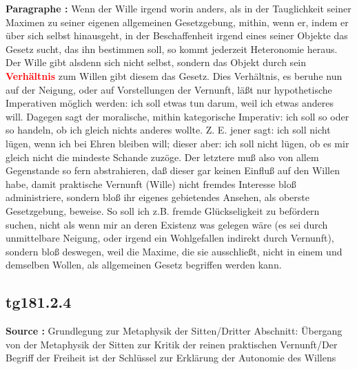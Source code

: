 \documentclass[a4paper,12pt,twoside]{book}
\newcommand{\match}[1]{\textcolor{red}{\textbf{#1}}}
\begin{document}
	\noindent\textbf{Paragraphe : }Wenn der Wille irgend worin anders, als in der Tauglichkeit seiner Maximen zu seiner eigenen allgemeinen Gesetzgebung, mithin, wenn er, indem er über sich selbst hinausgeht, in der Beschaffenheit irgend eines seiner Objekte das Gesetz sucht, das ihn bestimmen soll, so kommt jederzeit Heteronomie heraus. Der Wille gibt alsdenn sich nicht selbst, sondern das Objekt durch sein \match{Verhältnis} zum Willen gibt diesem das Gesetz. Dies Verhältnis, es beruhe nun auf der Neigung, oder auf Vorstellungen der Vernunft, läßt nur hypothetische Imperativen möglich werden: ich soll etwas tun darum, weil ich etwas anderes will. Dagegen sagt der moralische, mithin kategorische Imperativ: ich soll so oder so handeln, ob ich gleich nichts anderes wollte. Z. E. jener sagt: ich soll nicht lügen, wenn ich bei Ehren bleiben will; dieser aber: ich soll nicht lügen, ob es  mir gleich nicht die mindeste Schande zuzöge. Der letztere muß also von allem Gegenstande so fern abstrahieren, daß dieser gar keinen Einfluß auf den Willen habe, damit praktische Vernunft (Wille) nicht fremdes Interesse bloß administriere, sondern bloß ihr eigenes gebietendes Ansehen, als oberste Gesetzgebung, beweise. So soll ich z.B. fremde Glückseligkeit zu befördern suchen, nicht als wenn mir an deren Existenz was gelegen wäre (es sei durch unmittelbare Neigung, oder irgend ein Wohlgefallen indirekt durch Vernunft), sondern bloß deswegen, weil die Maxime, die sie ausschließt, nicht in einem und demselben Wollen, als allgemeinen Gesetz begriffen werden kann. 
	
	\subsection*{tg181.2.4} 
	\textbf{Source : }Grundlegung zur Metaphysik der Sitten/Dritter Abschnitt: Übergang von der Metaphysik der Sitten zur Kritik der reinen praktischen Vernunft/Der Begriff der Freiheit ist der Schlüssel zur Erklärung der Autonomie des Willens\\  
	
\end{document}
